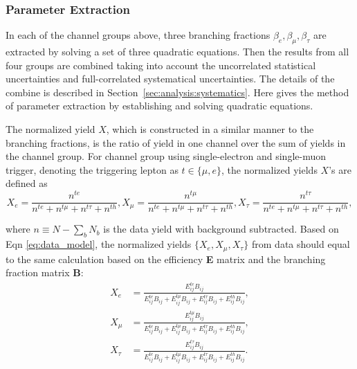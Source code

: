 




\subsubsection{Parameter Extraction}


In each of the channel groups above, three branching fractions $\beta_e,\beta_\mu,\beta_\tau$ are extracted by solving a set of
three quadratic equations. Then the results from all four groups are combined taking into account 
the uncorrelated statistical uncertainties and full-correlated systematical uncertainties. The details of the
combine is described in Section~\ref{sec:analysis:systematics}. Here gives the method of parameter extraction
by establishing and solving quadratic equations.


The normalized yield $X$, which is constructed in a similar manner to the branching fractions, 
is the ratio of yield in one channel over the sum of yields in the channel group. 
For channel group using single-electron and single-muon trigger, 
denoting the triggering lepton as $t\in \{\mu,e\}$, 
the normalized yields $X$'s are defined as
\begin{equation}
    X_{e}   = \frac{n^{t e}     }{n^{t e} + n^{t \mu} + n^{t \tau} + n^{t h}},
    X_{\mu} = \frac{n^{t \mu}   }{n^{t e} + n^{t \mu} + n^{t \tau} + n^{t h}}, 
    X_{\tau}= \frac{n^{t \tau}  }{n^{t e} + n^{t \mu} + n^{t \tau} + n^{t h}},
\end{equation}

\noindent where $n \equiv N - \sum_{b} N_b $ is the data yield with background subtracted. 
Based on Eqn \ref{eq:data_model}, the normalized yields $\{X_{e},X_{\mu},X_{\tau}\}$ from data should 
equal to the same calculation based on the efficiency \textbf{E} matrix and the branching fraction matrix \textbf{B}:
% 
\begin{equation} \label{quadEqA}
    \begin{split}
    X_e     &= \frac{ E_{ij}^{te}B_{ij}     }{  E_{ij}^{te}B_{ij} + E_{ij}^{t\mu}B_{ij} + E_{ij}^{t\tau}B_{ij} + E_{ij}^{th}B_{ij}} ,\\
    X_\mu   &= \frac{ E_{ij}^{t\mu}B_{ij}   }{  E_{ij}^{te}B_{ij} + E_{ij}^{t\mu}B_{ij} + E_{ij}^{t\tau}B_{ij} + E_{ij}^{th}B_{ij}} ,\\
    X_\tau  &= \frac{ E_{ij}^{t\tau}B_{ij}  }{  E_{ij}^{te}B_{ij} + E_{ij}^{t\mu}B_{ij} + E_{ij}^{t\tau}B_{ij} + E_{ij}^{th}B_{ij}}.
    \end{split}
\end{equation}


